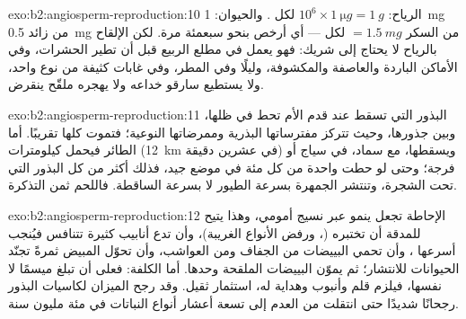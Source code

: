 \begin{solution}{exo:b2:angiosperm-reproduction:10}
الرياح: $10^{6}\times\qty{1}{\micro g} = \qty{1}{g}$ لكل . والحيوان:
\qty{1}{mg} من  زائد \qty{0.5}{mg} من السكر $= \qty{1.5}{mg}$
لكل  --- أي أرخص بنحو سبعمئة مرة. لكن الإلقاح بالرياح لا
يحتاج إلى شريك: فهو يعمل في مطلع الربيع قبل أن تطير الحشرات، وفي
الأماكن الباردة والعاصفة والمكشوفة، وليلًا وفي المطر، وفي غابات
كثيفة من نوع واحد، ولا يستطيع سارقو  خداعه ولا يهجره ملقّح
ينقرض.
\end{solution}

\begin{solution}{exo:b2:angiosperm-reproduction:11}
البذور التي تسقط عند قدم الأم تحط في ظلها، وبين جذورها، وحيث تتركز
مفترساتها البذرية وممرضاتها النوعية؛ فتموت كلها تقريبًا. أما الطائر
فيحمل  كيلومترات
(\qty{12}{km} في عشرين دقيقة) ويسقطها، مع سماد، في
سياج أو فرجة؛ وحتى لو حطت  واحدة من كل مئة في موضع جيد، فذلك
أكثر من كل البذور التي تحت الشجرة، وتنتشر الجمهرة بسرعة الطيور لا
بسرعة  الساقطة. فاللحم ثمن التذكرة.
\end{solution}

\begin{solution}{exo:b2:angiosperm-reproduction:12}
الإحاطة تجعل  ينمو عبر نسيج أمومي، وهذا يتيح للمدقة أن
تختبره (، ورفض الأنواع الغريبة)، وأن تدع أنابيب
كثيرة تتنافس فيُنجب أسرعها ، وأن تحمي البييضات من الجفاف ومن
العواشب، وأن تحوّل المبيض ثمرةً تجنّد الحيوانات للانتشار؛ ثم يموّن
 البييضات الملقحة وحدها. أما الكلفة: فعلى 
أن تبلغ ميسمًا لا  نفسها، فيلزم قلم وأنبوب وهداية له، 
استثمار ثقيل. وقد رجح الميزان لكاسيات البذور رجحانًا شديدًا حتى
انتقلت من العدم إلى تسعة أعشار أنواع النباتات في مئة
مليون سنة.
\end{solution}

